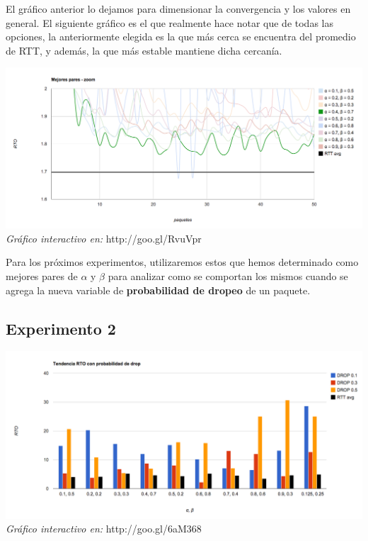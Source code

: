 El gráfico anterior lo dejamos para dimensionar la convergencia y los valores en general. El siguiente gráfico es el que realmente hace notar que de todas las opciones, la anteriormente elegida es la que más cerca se encuentra del promedio de RTT, y además, la que más estable mantiene dicha cercanía.

\begin{center}
	\includegraphics[scale=0.35]{graphics/best_pairs_zoom.png}
	\textit{Gráfico interactivo en:} http://goo.gl/RvuVpr
\end{center}

Para los próximos experimentos, utilizaremos estos que hemos determinado como mejores pares de $\alpha$ y $\beta$ para analizar como se comportan los mismos cuando se agrega la nueva variable de \textbf{probabilidad de dropeo} de un paquete.

\subsection{Experimento 2}

\begin{center}
	\includegraphics[scale=0.35]{graphics/tendencia_RTO_drop.png}
	\textit{Gráfico interactivo en:} http://goo.gl/6aM368
\end{center}